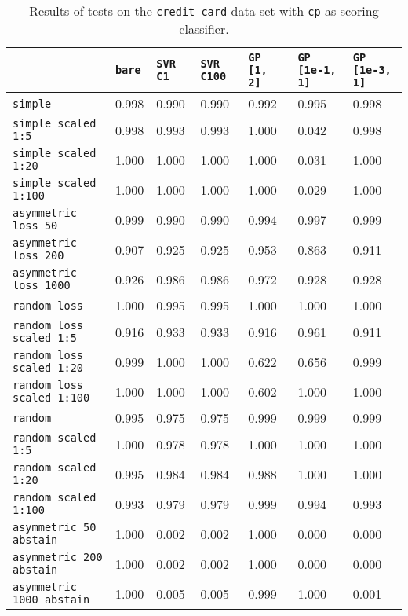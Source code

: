 \begin{table}[H]
{\scriptsize
\begin{tabu}{l|l|l|l|l|l|l}
&\texttt{bare} &\texttt{SVR C1} &\texttt{SVR C100} &\texttt{GP [1, 2]} &\texttt{GP [1e-1, 1]} &\texttt{GP [1e-3, 1]}  \\
\hline
\texttt{simple} &0.998 &0.990 &0.990 &0.992 &0.995 &0.998 \\
\texttt{simple scaled 1:5} &0.998 &0.993 &0.993 &1.000 &0.042 &0.998 \\
\texttt{simple scaled 1:20} &1.000 &1.000 &1.000 &1.000 &0.031 &1.000 \\
\texttt{simple scaled 1:100} &1.000 &1.000 &1.000 &1.000 &0.029 &1.000 \\
\texttt{asymmetric loss 50} &0.999 &0.990 &0.990 &0.994 &0.997 &0.999 \\
\texttt{asymmetric loss 200} &0.907 &0.925 &0.925 &0.953 &0.863 &0.911 \\
\texttt{asymmetric loss 1000} &0.926 &0.986 &0.986 &0.972 &0.928 &0.928 \\
\texttt{random loss} &1.000 &0.995 &0.995 &1.000 &1.000 &1.000 \\
\texttt{random loss scaled 1:5} &0.916 &0.933 &0.933 &0.916 &0.961 &0.911 \\
\texttt{random loss scaled 1:20} &0.999 &1.000 &1.000 &0.622 &0.656 &0.999 \\
\texttt{random loss scaled 1:100} &1.000 &1.000 &1.000 &0.602 &1.000 &1.000 \\
\texttt{random} &0.995 &0.975 &0.975 &0.999 &0.999 &0.999 \\
\texttt{random scaled 1:5} &1.000 &0.978 &0.978 &1.000 &1.000 &1.000 \\
\texttt{random scaled 1:20} &0.995 &0.984 &0.984 &0.988 &1.000 &1.000 \\
\texttt{random scaled 1:100} &0.993 &0.979 &0.979 &0.999 &0.994 &0.993 \\
\texttt{asymmetric 50 abstain} &1.000 &0.002 &0.002 &1.000 &0.000 &0.000 \\
\texttt{asymmetric 200 abstain} &1.000 &0.002 &0.002 &1.000 &0.000 &0.000 \\
\texttt{asymmetric 1000 abstain} &1.000 &0.005 &0.005 &0.999 &1.000 &0.001 \\
\end{tabu} }
\caption{Results of tests on the \texttt{credit card} data set
         with \texttt{cp} as scoring classifier.}
\end{table}

